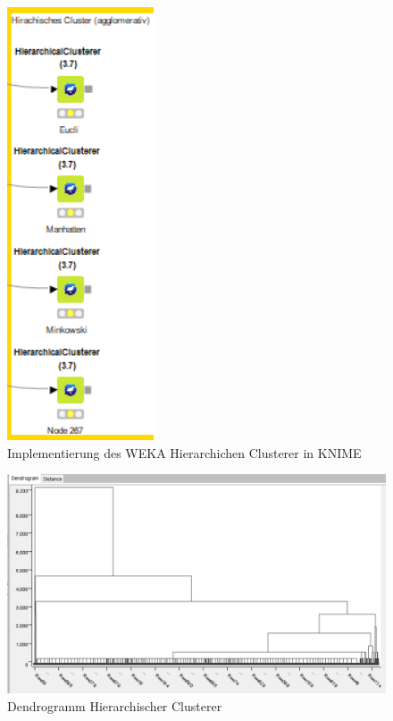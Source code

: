 \documentclass[
	handout,
  	aspectratio=169
]{beamer}
\begin{document}
	\begin{frame}
	\begin{center}					
					\begin{figure}[h]
						\includegraphics[scale=0.5]{../pictures/hierach.png}
						\caption{Implementierung des WEKA Hierarchichen Clusterer in KNIME}		
					\end{figure}	
				\end{center}	
	\end{frame}
		\begin{frame}
	\begin{center}					
					\begin{figure}[h]
						\includegraphics[scale=0.5]{../pictures/dendro.png}
						\caption{Dendrogramm Hierarchischer Clusterer}		
					\end{figure}	
				\end{center}	
	\end{frame}
\end{document}
